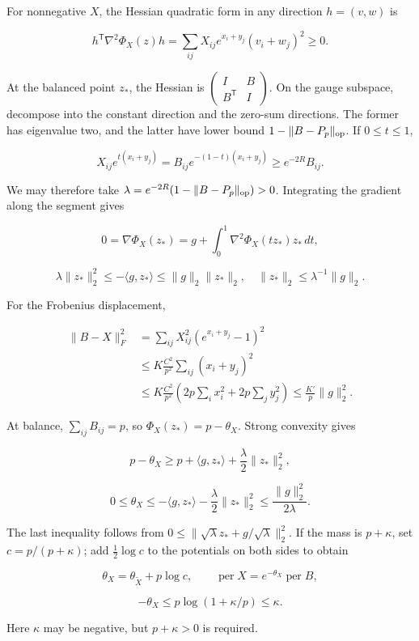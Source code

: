 \documentclass[11pt,a4paper]{article}
\begin{document}
For nonnegative \(X\), the Hessian quadratic form in any direction \(h=(v,w)\) is

\[
h^{\mathsf T}\nabla^2\Phi_X(z)h
=\sum_{ij}X_{ij}e^{x_i+y_j}(v_i+w_j)^2\ge0.
\]

At the balanced point \(z_*\), the Hessian is \(\left(\begin{smallmatrix}I&B\\B^{\mathsf T}&I\end{smallmatrix}\right)\). On the gauge subspace, decompose into the constant direction and the zero-sum directions. The former has eigenvalue two, and the latter have lower bound \(1-\|B-P_p\|_{\rm op}\). If \(0\le t\le1\),

\[
X_{ij}e^{t(x_i+y_j)}=B_{ij}e^{-(1-t)(x_i+y_j)}\ge e^{-2R}B_{ij}.
\]

We may therefore take \(\lambda=e^{-2R}(1-\|B-P_p\|_{\rm op})>0\). Integrating the gradient along the segment gives

\[
0=\nabla\Phi_X(z_*)=g+\int_0^1\nabla^2\Phi_X(tz_*)z_*\,dt,
\]

\[
\lambda\|z_*\|_2^2\le-\langle g,z_*\rangle\le\|g\|_2\|z_*\|_2,
\quad\|z_*\|_2\le\lambda^{-1}\|g\|_2.
\]

For the Frobenius displacement,

\[
\begin{aligned}
\|B-X\|_F^2
&=\sum_{ij}X_{ij}^2(e^{x_i+y_j}-1)^2\\
&\le K\frac{C^2}{p^2}\sum_{ij}(x_i+y_j)^2\\
&\le K\frac{C^2}{p^2}\left(2p\sum_ix_i^2+2p\sum_jy_j^2\right)
\le\frac{K'}p\|g\|_2^2.
\end{aligned}
\]

At balance, \(\sum_{ij}B_{ij}=p\), so \(\Phi_X(z_*)=p-\theta_X\). Strong convexity gives

\[
p-\theta_X\ge p+\langle g,z_*\rangle+\frac\lambda2\|z_*\|_2^2,
\]

\[
0\le\theta_X\le-\langle g,z_*\rangle-\frac\lambda2\|z_*\|_2^2
\le\frac{\|g\|_2^2}{2\lambda}.
\]

The last inequality follows from \(0\le\|\sqrt\lambda z_*+g/\sqrt\lambda\|_2^2\). If the mass is \(p+\kappa\), set \(c=p/(p+\kappa)\); add \(\tfrac12\log c\) to the potentials on both sides to obtain

\[
\theta_X=\theta_{\widetilde X}+p\log c,\qquad
\operatorname{per}X=e^{-\theta_X}\operatorname{per}B,
\]

\[
-\theta_X\le p\log(1+\kappa/p)\le\kappa.
\]

Here \(\kappa\) may be negative, but \(p+\kappa>0\) is required.
\end{document}
